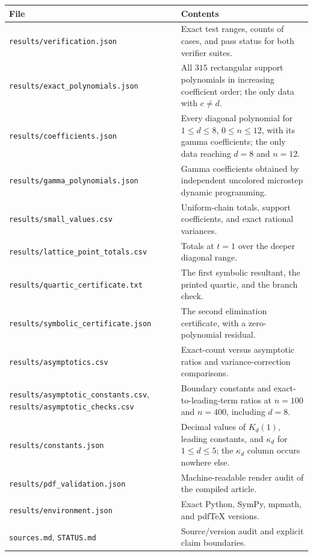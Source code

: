 \documentclass[11pt]{article}
\numberwithin{equation}{section}
\theoremstyle{definition}
\begin{document}
\begin{longtable}{@{}>{\raggedright\arraybackslash}p{}
                    >{\raggedright\arraybackslash}p{}@{}}
\toprule
File & Contents\\
\midrule
\endhead
\texttt{results/verification.json} & Exact test ranges, counts of cases, and
pass status for both verifier suites.\\
\texttt{results/exact\_polynomials.json} & All $315$ rectangular support
polynomials in increasing coefficient order; the only data with $c\neq d$.\\
\texttt{results/coefficients.json} & Every diagonal polynomial for
$1\leq d\leq8$, $0\leq n\leq12$, with its gamma coefficients; the only data
reaching $d=8$ and $n=12$.\\
\texttt{results/gamma\_polynomials.json} & Gamma coefficients obtained by
independent uncolored microstep dynamic programming.\\
\texttt{results/small\_values.csv} & Uniform-chain totals, support
coefficients, and exact rational variances.\\
\texttt{results/lattice\_point\_totals.csv} & Totals at $t=1$ over the deeper
diagonal range.\\
\texttt{results/quartic\_certificate.txt} & The first symbolic resultant, the
printed quartic, and the branch check.\\
\texttt{results/symbolic\_certificate.json} & The second elimination
certificate, with a zero-polynomial residual.\\
\texttt{results/asymptotics.csv} & Exact-count versus asymptotic ratios and
variance-correction comparisons.\\
\texttt{results/asymptotic\_constants.csv},
\texttt{results/asymptotic\_checks.csv} & Boundary constants and
exact-to-leading-term ratios at $n=100$ and $n=400$, including $d=8$.\\
\texttt{results/constants.json} & Decimal values of $K_d(1)$, leading
constants, and $\kappa_d$ for $1\leq d\leq5$; the $\kappa_d$ column occurs
nowhere else.\\
\texttt{results/pdf\_validation.json} & Machine-readable render audit of the
compiled article.\\
\texttt{results/environment.json} & Exact Python, SymPy, mpmath, and pdfTeX
versions.\\
\texttt{sources.md}, \texttt{STATUS.md} & Source/version audit and explicit
claim boundaries.\\
\bottomrule
\end{longtable}
\end{document}
